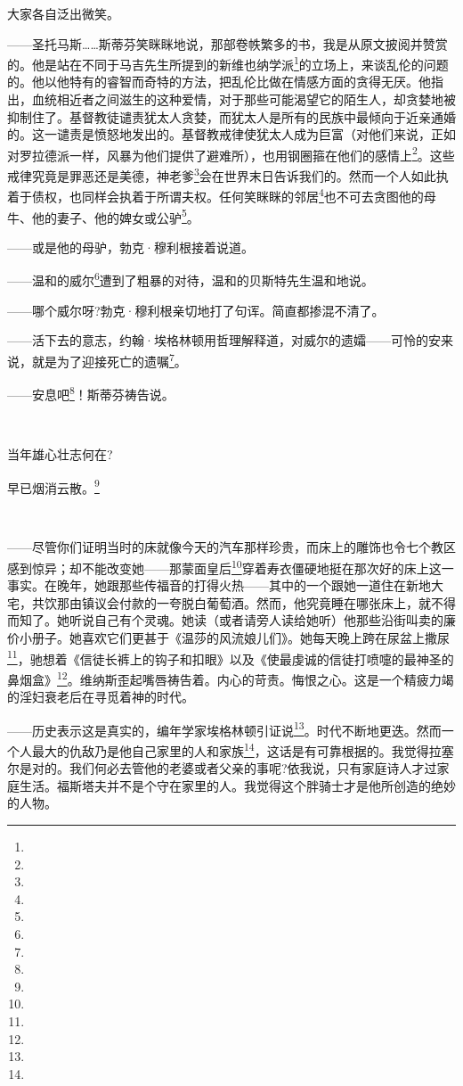\par 大家各自泛出微笑。
\par ——圣托马斯……斯蒂芬笑眯眯地说，那部卷帙繁多的书，我是从原文披阅并赞赏的。他是站在不同于马吉先生所提到的新维也纳学派\footnote{}的立场上，来谈乱伦的问题的。他以他特有的睿智而奇特的方法，把乱伦比做在情感方面的贪得无厌。他指出，血统相近者之间滋生的这种爱情，对于那些可能渴望它的陌生人，却贪婪地被抑制住了。基督教徒谴责犹太人贪婪，而犹太人是所有的民族中最倾向于近亲通婚的。这一谴责是愤怒地发出的。基督教戒律使犹太人成为巨富（对他们来说，正如对罗拉德派一样，风暴为他们提供了避难所），也用钢圈箍在他们的感情上\footnote{}。这些戒律究竟是罪恶还是美德，神老爹\footnote{}会在世界末日告诉我们的。然而一个人如此执着于债权，也同样会执着于所谓夫权。任何笑眯眯的邻居\footnote{}也不可去贪图他的母牛、他的妻子、他的婢女或公驴\footnote{}。
\par ——或是他的母驴，勃克·穆利根接着说道。
\par ——温和的威尔\footnote{}遭到了粗暴的对待，温和的贝斯特先生温和地说。
\par ——哪个威尔呀?勃克·穆利根亲切地打了句诨。简直都掺混不清了。
\par ——活下去的意志，约翰·埃格林顿用哲理解释道，对威尔的遗孀——可怜的安来说，就是为了迎接死亡的遗嘱\footnote{}。
\par ——安息吧\footnote{}！斯蒂芬祷告说。
\par  
\par 当年雄心壮志何在?
\par 早已烟消云散。\footnote{}
\par  
\par ——尽管你们证明当时的床就像今天的汽车那样珍贵，而床上的雕饰也令七个教区感到惊异；却不能改变她——那蒙面皇后\footnote{}穿着寿衣僵硬地挺在那次好的床上这一事实。在晚年，她跟那些传福音的打得火热——其中的一个跟她一道住在新地大宅，共饮那由镇议会付款的一夸脱白葡萄酒。然而，他究竟睡在哪张床上，就不得而知了。她听说自己有个灵魂。她读（或者请旁人读给她听）他那些沿街叫卖的廉价小册子。她喜欢它们更甚于《温莎的风流娘儿们》。她每天晚上跨在尿盆上撒尿\footnote{}，驰想着《信徒长裤上的钩子和扣眼》以及《使最虔诚的信徒打喷嚏的最神圣的鼻烟盒》\footnote{}。维纳斯歪起嘴唇祷告着。内心的苛责。悔恨之心。这是一个精疲力竭的淫妇衰老后在寻觅着神的时代。
\par ——历史表示这是真实的，编年学家埃格林顿引证说\footnote{}。时代不断地更迭。然而一个人最大的仇敌乃是他自己家里的人和家族\footnote{}，这话是有可靠根据的。我觉得拉塞尔是对的。我们何必去管他的老婆或者父亲的事呢?依我说，只有家庭诗人才过家庭生活。福斯塔夫并不是个守在家里的人。我觉得这个胖骑士才是他所创造的绝妙的人物。

